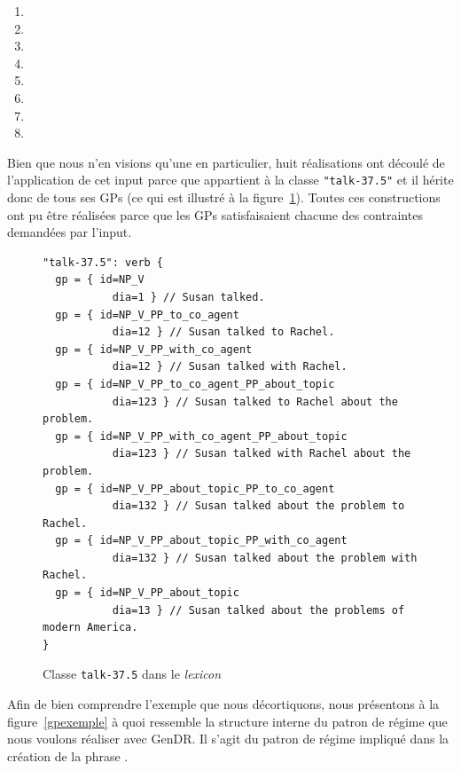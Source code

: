 \begin{enumerate}
  \item {}
  \item {}
  \item {}
  \item {}
  \item {}
  \item {}
  \item {}
  \item {}
\end{enumerate}

Bien que nous n'en visions qu'une en particulier, huit réalisations ont découlé de l'application de cet input parce que  appartient à la classe \texttt{"talk-37.5"} et il hérite donc de tous ses \acp{GP} (ce qui est illustré à la figure~\ref{fig:classtalk375}). Toutes ces constructions ont pu être réalisées parce que les \acp{GP} satisfaisaient chacune des contraintes demandées par l'input.

\begin{figure}[htb]
  \caption{Classe \texttt{talk-37.5} dans le \emph{lexicon}}
	\label{fig:classtalk375}
\begin{lstlisting}[language=mate]
"talk-37.5": verb {
  gp = { id=NP_V
	       dia=1 } // Susan talked.
  gp = { id=NP_V_PP_to_co_agent
	       dia=12 } // Susan talked to Rachel.
  gp = { id=NP_V_PP_with_co_agent
	       dia=12 } // Susan talked with Rachel.
  gp = { id=NP_V_PP_to_co_agent_PP_about_topic
	       dia=123 } // Susan talked to Rachel about the problem.
  gp = { id=NP_V_PP_with_co_agent_PP_about_topic
	       dia=123 } // Susan talked with Rachel about the problem.
  gp = { id=NP_V_PP_about_topic_PP_to_co_agent
	       dia=132 } // Susan talked about the problem to Rachel.
  gp = { id=NP_V_PP_about_topic_PP_with_co_agent
	       dia=132 } // Susan talked about the problem with Rachel.
  gp = { id=NP_V_PP_about_topic
	       dia=13 } // Susan talked about the problems of modern America.
}
\end{lstlisting}
\end{figure}

Afin de bien comprendre l'exemple que nous décortiquons, nous présentons à la figure~\ref{gpexemple} à quoi ressemble la structure interne du patron de régime que nous voulons réaliser avec GenDR. Il s'agit du patron de régime impliqué dans la création de la phrase .

